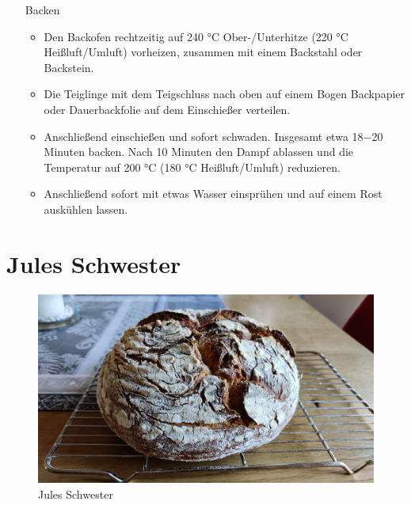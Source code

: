 \begin{enumerate}
\begin{itemize}
    \end{itemize}
    \item [Backen]
    \begin{itemize}
        \item Den Backofen rechtzeitig auf 240 °C Ober-/Unterhitze (220 °C Heißluft/Umluft) vorheizen, zusammen mit einem Backstahl oder Backstein.
        \item Die Teiglinge mit dem Teigschluss nach oben auf einem Bogen Backpapier oder Dauerbackfolie auf dem Einschießer verteilen.
        \item Anschließend einschießen und sofort schwaden. Insgesamt etwa 18−20 Minuten backen. Nach 10 Minuten den Dampf ablassen und die Temperatur auf 200 °C (180 °C Heißluft/Umluft) reduzieren.
        \item Anschließend sofort mit etwas Wasser einsprühen und auf einem Rost auskühlen lassen.
    \end{itemize}
\end{enumerate}

\section{Jules Schwester}  

\begin{figure}[H]
    \centering
    \includegraphics[width=0.7\linewidth]{Bilder/JulesSchwester}
    \caption{Jules Schwester}
    \label{fig:auffrischbrotJulesSchwester}
\end{figure}


